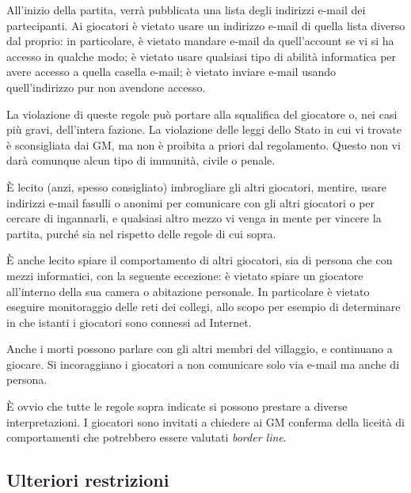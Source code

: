 \documentclass[a4paper,10pt]{article}
\begin{document}
All'inizio della partita, verrà pubblicata una lista degli indirizzi e-mail dei partecipanti. Ai giocatori è vietato usare un indirizzo e-mail di quella lista diverso dal proprio: in particolare, è vietato mandare e-mail da quell'account se vi si ha accesso in qualche modo; è vietato usare qualsiasi tipo di abilità informatica per avere accesso a quella casella e-mail; è vietato inviare e-mail usando quell'indirizzo pur non avendone accesso.

La violazione di queste regole può portare alla squalifica del giocatore o, nei casi più gravi, dell'intera fazione. La violazione delle leggi dello Stato in cui vi trovate è sconsigliata dai GM, ma non è proibita a priori dal regolamento. Questo non vi darà comunque alcun tipo di immunità, civile o penale.

È lecito (anzi, spesso consigliato) imbrogliare gli altri giocatori, mentire, usare indirizzi e-mail fasulli o anonimi per comunicare con gli altri giocatori o per cercare di ingannarli, e qualsiasi altro mezzo vi venga in mente per vincere la partita, purché sia nel rispetto delle regole di cui sopra.

È anche lecito spiare il comportamento di altri giocatori, sia di persona che con mezzi informatici, con la seguente eccezione: è vietato spiare un giocatore all'interno della sua camera o abitazione personale. In particolare è vietato eseguire monitoraggio delle reti dei collegi, allo scopo per esempio di determinare in che istanti i giocatori sono connessi ad Internet. %

Anche i morti possono parlare con gli altri membri del villaggio, e continuano a giocare. Si incoraggiano i giocatori a non comunicare solo via e-mail ma anche di persona.

È ovvio che tutte le regole sopra indicate si possono prestare a diverse interpretazioni. I giocatori sono invitati a chiedere ai GM conferma della liceità di comportamenti che potrebbero essere valutati \emph{border line}.

\subsection{Ulteriori restrizioni}
\end{document}
